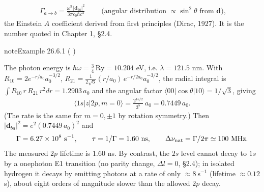 \documentclass[letterpaper,10pt,english]{jupyterBook}
\begin{document}
\begin{equation*}
\begin{split}
\boxed{\;\Gamma_{a\to b}=\frac{\omega^3\,|\mathbf d_{ba}|^2}{3\pi\varepsilon_0\hbar c^3}\;}\qquad\Big(\text{angular distribution }\propto\sin^2\theta\text{ from }\mathbf d\Big),
\end{split}
\end{equation*}
\sphinxAtStartPar
the Einstein \(A\) coefficient derived from first principles (Dirac, 1927). It is the number quoted in Chapter 1, §2.4.
\label{ch/quantum-mechanics/qft/interactions-e-em-fields-atom-spectrum:example-0}
\begin{sphinxadmonition}{note}{Example 26.6.1 ( )}



\sphinxAtStartPar
The photon energy is \(\hbar\omega=\tfrac34\,\text{Ry}=10.204\) eV, i.e. \(\lambda=121.5\) nm. With \(R_{10}=2e^{-r/a_0}a_0^{-3/2}\), \(R_{21}=\frac{1}{2\sqrt6}(r/a_0)\,e^{-r/2a_0}a_0^{-3/2}\), the radial integral is \(\int R_{10}\,r\,R_{21}\,r^2dr=1.2903\,a_0\) and the angular factor \(\langle00|\cos\theta|10\rangle=1/\sqrt3\), giving
\begin{equation*}
\begin{split}
\langle1s|z|2p,m{=}0\rangle=\frac{2^{15/2}}{3^5}\,a_0=0.7449\,a_0 .
\end{split}
\end{equation*}
\sphinxAtStartPar
(The rate is the same for \(m=0,\pm1\) by rotation symmetry.) Then \(|\mathbf d_{ba}|^2=e^2(0.7449\,a_0)^2\) and
\begin{equation*}
\begin{split}
\Gamma=6.27\times10^{8}\ \text{s}^{-1},\qquad\tau=1/\Gamma=1.60\ \text{ns},\qquad\Delta\nu_{\rm nat}=\Gamma/2\pi\simeq100\ \text{MHz}.
\end{split}
\end{equation*}
\sphinxAtStartPar
The measured \(2p\) lifetime is \(1.60\) ns. By contrast, the \(2s\) level cannot decay to \(1s\) by a one\sphinxhyphen{}photon E1 transition (no parity change, \(\Delta l=0\), §2.4); in isolated hydrogen it decays by emitting  photons at a rate of only \(\approx8\ \text{s}^{-1}\) (lifetime \(\approx0.12\) s), about eight orders of magnitude slower than the allowed \(2p\) decay.
\end{sphinxadmonition}
\end{document}
